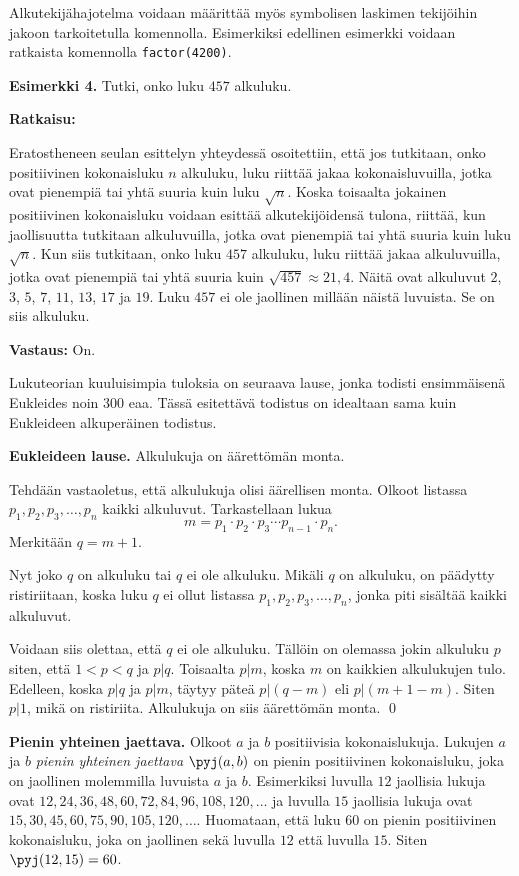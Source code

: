 Alkutekijähajotelma voidaan määrittää myös symbolisen laskimen tekijöihin jakoon tarkoitetulla komennolla. Esimerkiksi edellinen esimerkki voidaan ratkaista komennolla {\tt factor(4200)}.

{\bf Esimerkki 4.} Tutki, onko luku $457$ alkuluku.

{\bf Ratkaisu:}

Eratostheneen seulan esittelyn yhteydessä osoitettiin, että
jos tutkitaan, onko positiivinen kokonaisluku $n$ alkuluku,
luku riittää jakaa kokonaisluvuilla, jotka ovat pienempiä tai
yhtä suuria kuin luku $\sqrt{n}$. Koska toisaalta jokainen
positiivinen kokonaisluku voidaan esittää alkutekijöidensä
tulona, riittää, kun jaollisuutta tutkitaan alkuluvuilla,
jotka ovat pienempiä tai yhtä suuria kuin luku $\sqrt{n}$.
Kun siis tutkitaan, onko luku $457$ alkuluku, luku riittää
jakaa alkuluvuilla, jotka ovat pienempiä tai yhtä suuria kuin
$\sqrt{457} \approx 21,4$. Näitä ovat alkuluvut $2$, $3$, $5$,
$7$, $11$, $13$, $17$ ja $19$. Luku $457$ ei ole jaollinen
millään näistä luvuista. Se on siis alkuluku.

{\bf Vastaus:} On.

Lukuteorian kuuluisimpia tuloksia on seuraava lause, jonka todisti ensimmäisenä Eukleides noin 300 eaa. Tässä esitettävä todistus on idealtaan sama kuin Eukleideen alkuperäinen todistus.

{\bf Eukleideen lause.} Alkulukuja on äärettömän monta.

\proof 
Tehdään vastaoletus, että alkulukuja olisi äärellisen monta. Olkoot listassa
$p_1,p_2,p_3,\ldots,p_n$ kaikki alkuluvut. Tarkastellaan lukua
\[
m = p_1\cdot p_2\cdot p_3 \cdots p_{n-1}\cdot p_n.
\]
Merkitään $q=m+1$.

Nyt joko $q$ on alkuluku tai $q$ ei ole alkuluku. Mikäli $q$ on alkuluku, on päädytty ristiriitaan, koska luku $q$ ei ollut listassa $p_1,p_2,p_3,\ldots,p_n$, jonka piti sisältää kaikki alkuluvut.

Voidaan siis olettaa, että $q$ ei ole alkuluku. Tällöin on olemassa jokin alkuluku $p$ siten, että $1<p<q$ ja $p|q$. Toisaalta $p|m$, koska $m$ on kaikkien alkulukujen tulo. Edelleen, koska $p|q$ ja $p|m$, täytyy päteä $p|(q-m)$ eli $p|(m+1-m)$. Siten $p|1$, mikä on ristiriita. Alkulukuja on siis äärettömän monta.
\qed


{\bf Pienin yhteinen jaettava.}
Olkoot $a$ ja $b$ positiivisia kokonaislukuja. Lukujen $a$ ja $b$ {\em pienin yhteinen jaettava} $\pyj(a,b)$ on pienin positiivinen kokonaisluku, joka on jaollinen molemmilla luvuista $a$ ja $b$. Esimerkiksi luvulla $12$ jaollisia lukuja ovat $12, 24, 36, 48, 60, 72, 84, 96, 108, 120, \ldots$ ja luvulla $15$ jaollisia lukuja ovat $15, 30, 45, 60, 75, 90, 105, 120, \ldots$. Huomataan, että luku $60$ on pienin positiivinen kokonaisluku, joka on jaollinen sekä luvulla $12$ että luvulla $15$. Siten $\pyj(12, 15) = 60$.

